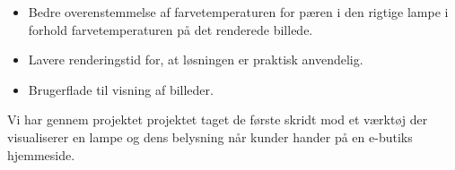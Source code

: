 \begin{itemize}
\item Bedre overenstemmelse af farvetemperaturen for pæren i den rigtige lampe i forhold farvetemperaturen på det renderede billede.
\item Lavere renderingstid for, at løsningen er praktisk anvendelig.
\item Brugerflade til visning af billeder.
\end{itemize}

Vi har gennem projektet projektet taget de første skridt mod et værktøj der visualiserer en lampe og dens belysning når kunder hander på en e-butiks hjemmeside.
\clearpage